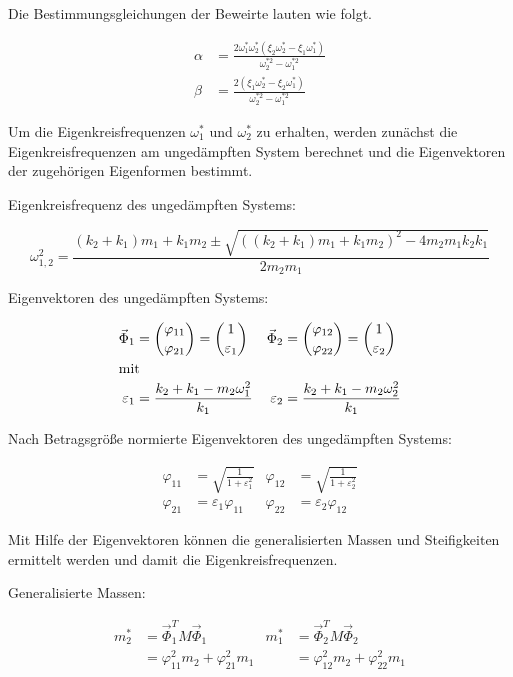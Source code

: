 Die Bestimmungsgleichungen der Beweirte lauten wie folgt. \cite{Shambhu}

\begin{align*}
\alpha &= \frac{2 \omega_1^* \omega_2^* (\xi_2 \omega_2^* - \xi_1 \omega_1^*)}{\omega_2^{*2} - \omega_1^{*2}}\\
\beta  &= \frac{2 (\xi_1 \omega_2^* - \xi_2 \omega_1^*)}{\omega_2^{*2} - \omega_1^{*2}}
\end{align*}

Um die Eigenkreisfrequenzen $\omega_1^*$ und $\omega_2^*$ zu erhalten, werden zunächst die Eigenkreisfrequenzen am ungedämpften System berechnet und die Eigenvektoren der zugehörigen Eigenformen bestimmt.

Eigenkreisfrequenz des ungedämpften Systems:

\begin{equation*}
\omega_{1,2}^2 = \frac{(k_2 + k_1) m_1 + k_1 m_2 \pm \sqrt{((k_2 + k_1) m_1 + k_1 m_2)^2 - 4 m_2 m_1 k_2 k_1}}{2 m_2 m_1}
\end{equation*}

Eigenvektoren des ungedämpften Systems:

\begin{align*}
\vec{\Phi}_1 &= \binom{\varphi_{11}}{\varphi_{21}} = \binom{1}{\varepsilon_1} & \vec{\Phi}_2 &= \binom{\varphi_{12}}{\varphi_{22}} = \binom{1}{\varepsilon_2}\\
\intertext{mit}
\varepsilon_1 &= \frac{k_2 + k_1 - m_2 \omega_1^2}{k_1} & \varepsilon_2 &= \frac{k_2 + k_1 - m_2 \omega_2^2}{k_1}
\end{align*}

Nach Betragsgröße normierte Eigenvektoren des ungedämpften Systems:

\begin{align*}
\varphi_{11} &= \sqrt{\frac{1}{1 + \varepsilon_1^2}}  &  \varphi_{12} &= \sqrt{\frac{1}{1 + \varepsilon_2^2}}\\
\varphi_{21} &= \varepsilon_1 \varphi_{11}            &  \varphi_{22} &= \varepsilon_2 \varphi_{12}
\end{align*}

Mit Hilfe der Eigenvektoren können die generalisierten Massen und Steifigkeiten ermittelt werden und damit die Eigenkreisfrequenzen.

Generalisierte Massen:

\begin{align*}
m_2^* &= \vec{\Phi}_1^T M \vec{\Phi}_1               &   m_1^* &= \vec{\Phi}_2^T M \vec{\Phi}_2\\
      &= \varphi_{11}^2 m_2 + \varphi_{21}^2 m_1     &         &= \varphi_{12}^2 m_2 + \varphi_{22}^2 m_1
\end{align*}

